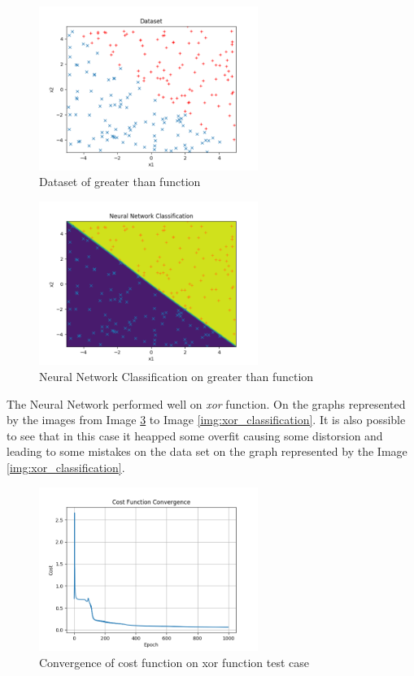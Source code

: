 \documentclass[journal]{IEEEtran}
\begin{document}
\begin{figure}
  \begin{center}
  \includegraphics[width=2.8in]{./../code/result_greater_than/dataset.png}
  \caption{Dataset of greater than function}
  \label{img:greater_data_set}
  \end{center}
\end{figure}

\begin{figure}
  \begin{center}
  \includegraphics[width=2.8in]{./../code/result_greater_than/neural_net_classification.png}
  \caption{Neural Network Classification on greater than function}
  \label{img:greater_classification}
  \end{center}
\end{figure}

The Neural Network performed well on \textit{xor} function. On the graphs represented by the images from Image \ref{img:xor_cost} to Image \ref{img:xor_classification}. It is also possible to see that in this case it heapped some overfit causing some distorsion and leading to some mistakes on the data set on the graph represented by the Image \ref{img:xor_classification}.

\begin{figure}
  \begin{center}
  \includegraphics[width=2.8in]{./../code/result_xor/cost_function_convergence.png}
  \caption{Convergence of cost function on xor function test case}
  \label{img:xor_cost}
  \end{center}
\end{figure}
\end{document}
